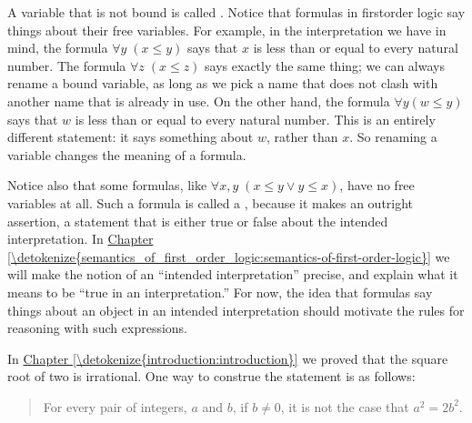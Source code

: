 \documentclass[letterpaper,10pt,english]{sphinxmanual}
\begin{document}
\sphinxAtStartPar
A variable that is not bound is called . Notice that formulas in first\sphinxhyphen{}order logic say things about their free variables. For example, in the interpretation we have in mind, the formula \(\forall y \; (x \le y)\) says that \(x\) is less than or equal to every natural number. The formula \(\forall z \; (x \le z)\) says exactly the same thing; we can always rename a bound variable, as long as we pick a name that does not clash with another name that is already in use. On the other hand, the formula \(\forall y (w \le y)\) says that \(w\) is less than or equal to every natural number. This is an entirely different statement: it says something about \(w\), rather than \(x\). So renaming a  variable changes the meaning of a formula.

\sphinxAtStartPar
Notice also that some formulas, like \(\forall x, y \; (x \le y \vee y \le x)\), have no free variables at all. Such a formula is called a , because it makes an outright assertion, a statement that is either true or false about the intended interpretation. In \hyperref[\detokenize{semantics_of_first_order_logic:semantics-of-first-order-logic}]{Chapter \ref{\detokenize{semantics_of_first_order_logic:semantics-of-first-order-logic}}} we will make the notion of an “intended interpretation” precise, and explain what it means to be “true in an interpretation.” For now, the idea that formulas say things about an object in an intended interpretation should motivate the rules for reasoning with such expressions.

\sphinxAtStartPar
In \hyperref[\detokenize{introduction:introduction}]{Chapter \ref{\detokenize{introduction:introduction}}} we proved that the square root of two is irrational. One way to construe the statement is as follows:
\begin{quote}

\sphinxAtStartPar
For every pair of integers, \(a\) and \(b\), if \(b \ne 0\), it is not the case that \(a^2 = 2 b^2\).
\end{quote}
\end{document}
